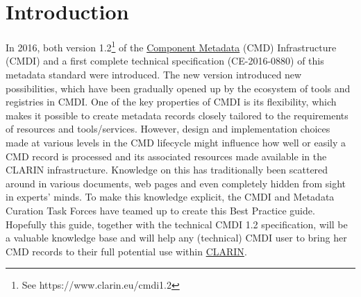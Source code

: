 \section{Introduction}\label{introduction}

In 2016, both version 1.2\footnote{See https://www.clarin.eu/cmdi1.2} of
the
\href{https://www.gitbook.com/book/clarin-eric/cmdi-best-practices/edit\#}{Component
Metadata} (CMD) Infrastructure (CMDI) and a first complete technical
specification (CE-2016-0880) of this metadata standard were introduced.
The new version introduced new possibilities, which have been gradually
opened up by the ecosystem of tools and registries in CMDI. One of the
key properties of CMDI is its flexibility, which makes it possible to
create metadata records closely tailored to the requirements of
resources and tools/services. However, design and implementation choices
made at various levels in the CMD lifecycle might influence how well or
easily a CMD record is processed and its associated resources made
available in the CLARIN infrastructure. Knowledge on this has
traditionally been scattered around in various documents, web pages and
even completely hidden from sight in experts' minds. To make this
knowledge explicit, the CMDI and Metadata Curation Task Forces have
teamed up to create this Best Practice guide. Hopefully this guide,
together with the technical CMDI 1.2 specification, will be a valuable
knowledge base and will help any (technical) CMDI user to bring her CMD
records to their full potential use within
\href{https://www.clarin.eu}{CLARIN}.
